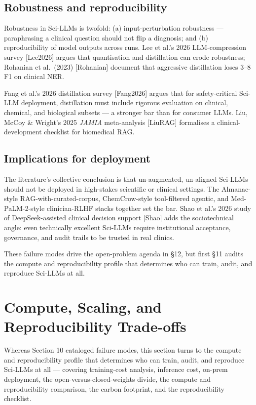\documentclass{article}
\begin{document}
\subsection{Robustness and reproducibility}\label{robustness-and-reproducibility}

Robustness in Sci-LLMs is twofold: (a) input-perturbation robustness --- paraphrasing a clinical question should not flip a diagnosis; and (b) reproducibility of model outputs across runs. Lee et al.'s 2026 LLM-compression survey {[}Lee2026{]} argues that quantisation and distillation can erode robustness; Rohanian et al.~(2023) {[}Rohanian{]} document that aggressive distillation loses 3--8 F1 on clinical NER.

Fang et al.'s 2026 distillation survey {[}Fang2026{]} argues that for safety-critical Sci-LLM deployment, distillation must include rigorous evaluation on clinical, chemical, and biological subsets --- a stronger bar than for consumer LLMs. Liu, McCoy \& Wright's 2025 \emph{JAMIA} meta-analysis {[}LiuRAG{]} formalises a clinical-development checklist for biomedical RAG.

\subsection{Implications for deployment}\label{implications-for-deployment}

The literature's collective conclusion is that un-augmented, un-aligned Sci-LLMs should not be deployed in high-stakes scientific or clinical settings. The Almanac-style RAG-with-curated-corpus, ChemCrow-style tool-filtered agentic, and Med-PaLM-2-style clinician-RLHF stacks together set the bar. Shao et al.'s 2026 study of DeepSeek-assisted clinical decision support {[}Shao{]} adds the sociotechnical angle: even technically excellent Sci-LLMs require institutional acceptance, governance, and audit trails to be trusted in real clinics.

These failure modes drive the open-problem agenda in §12, but first §11 audits the compute and reproducibility profile that determines who can train, audit, and reproduce Sci-LLMs at all.

\section{Compute, Scaling, and Reproducibility Trade-offs}\label{compute-scaling-and-reproducibility-trade-offs}

Whereas Section 10 cataloged failure modes, this section turns to the compute and reproducibility profile that determines who can train, audit, and reproduce Sci-LLMs at all --- covering training-cost analysis, inference cost, on-prem deployment, the open-versus-closed-weights divide, the compute and reproducibility comparison, the carbon footprint, and the reproducibility checklist.
\end{document}
